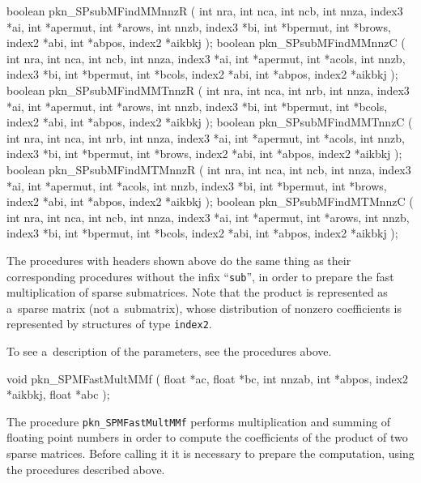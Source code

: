 \medskip
\begin{listingC}
boolean pkn_SPsubMFindMMnnzR ( int nra, int nca, int ncb,  
                      int nnza, index3 *ai, int *apermut, int *arows,
                      int nnzb, index3 *bi, int *bpermut, int *brows,
                      index2 *abi, int *abpos, index2 *aikbkj );
boolean pkn_SPsubMFindMMnnzC ( int nra, int nca, int ncb,  
                      int nnza, index3 *ai, int *apermut, int *acols,
                      int nnzb, index3 *bi, int *bpermut, int *bcols,
                      index2 *abi, int *abpos, index2 *aikbkj );
boolean pkn_SPsubMFindMMTnnzR ( int nra, int nca, int nrb,  
                       int nnza, index3 *ai, int *apermut, int *arows,
                       int nnzb, index3 *bi, int *bpermut, int *bcols,
                       index2 *abi, int *abpos, index2 *aikbkj );
boolean pkn_SPsubMFindMMTnnzC ( int nra, int nca, int nrb,  
                       int nnza, index3 *ai, int *apermut, int *acols,
                       int nnzb, index3 *bi, int *bpermut, int *brows,
                       index2 *abi, int *abpos, index2 *aikbkj );
boolean pkn_SPsubMFindMTMnnzR ( int nra, int nca, int ncb,  
                       int nnza, index3 *ai, int *apermut, int *acols,
                       int nnzb, index3 *bi, int *bpermut, int *brows,
                       index2 *abi, int *abpos, index2 *aikbkj );
boolean pkn_SPsubMFindMTMnnzC ( int nra, int nca, int ncb,  
                       int nnza, index3 *ai, int *apermut, int *arows,
                       int nnzb, index3 *bi, int *bpermut, int *bcols,
                       index2 *abi, int *abpos, index2 *aikbkj );
\end{listingC}
The procedures with headers shown above do the same thing as their
corresponding procedures without the infix ``\texttt{sub}'', in order to
prepare the fast multiplication of sparse submatrices. Note that the product
is represented as a~sparse matrix (not a~submatrix), whose distribution of
nonzero coefficients is represented by structures of type \texttt{index2}.

To see a~description of the parameters, see the procedures above.

\medskip
\begin{listingC}
void pkn_SPMFastMultMMf ( float *ac, float *bc,
                          int nnzab, int *abpos, index2 *aikbkj,
                          float *abc );
\end{listingC}
The procedure \texttt{pkn\_SPMFastMultMMf} performs multiplication and
summing of floating point numbers in order to compute the coefficients of
the product of two sparse matrices. Before calling it it is necessary to
prepare the computation, using the procedures described above.


